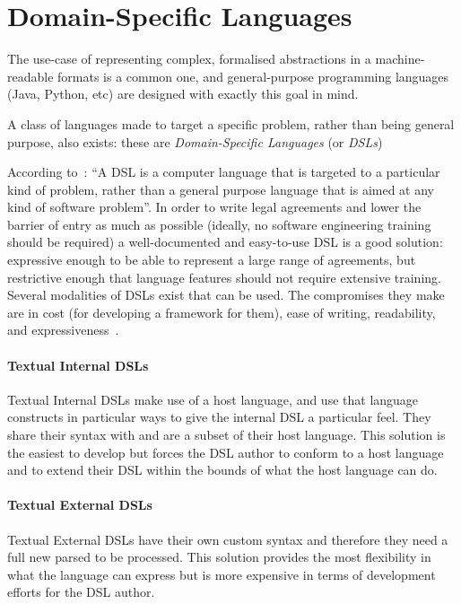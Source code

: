 \section{Domain-Specific Languages}\label{sec:dsls}

The use-case of representing complex, formalised abstractions in a machine-readable formats is a common one, and general-purpose programming languages (Java, Python, etc) are designed with exactly this goal in mind.

A class of languages made to target a specific problem, rather than being general purpose, also exists: these are \emph{Domain-Specific Languages} (or \emph{DSLs})

According to~\cite{fowlerDsl}: ``A DSL is a computer language that is targeted to a particular kind of problem, rather than a general purpose language that is aimed at any kind of software problem''.
In order to write legal agreements and lower the barrier of entry as much as possible (ideally, no software engineering training should be required) a well-documented and easy-to-use DSL is a good solution: expressive enough to be able to represent a large range of agreements, but restrictive enough that language features should not require extensive training.\\

Several modalities of DSLs exist that can be used.
The compromises they make are in cost (for developing a framework for them), ease of writing, readability, and expressiveness~\cite{fowlerDslGuide, fowlerLangWorkbench}.

\paragraph{Textual Internal DSLs}

Textual Internal DSLs make use of a host language, and use that language constructs in particular ways to give the internal DSL a particular feel.
They share their syntax with and are a subset of their host language.
This solution is the easiest to develop but forces the DSL author to conform to a host language and to extend their DSL within the bounds of what the host language can do.

\paragraph{Textual External DSLs}

Textual External DSLs have their own custom syntax and therefore they need a full new parsed to be processed.
This solution provides the most flexibility in what the language can express but is more expensive in terms of development efforts for the DSL author.

